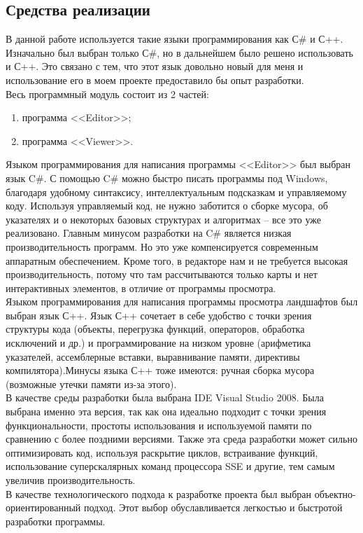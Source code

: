 \documentclass[a4paper, 10pt]{article}
\begin{document}
	\subsection{Средства реализации}
	\hspace*{5mm} В данной работе используется такие языки программирования как С\# и С++. Изначально был выбран только С\#, но в дальнейшем было решено использовать и С++. Это связано с тем, что этот язык довольно новый для меня и использование его в моем проекте предоставило бы опыт разработки.
	\\ \hspace*{5mm} Весь программный модуль состоит из 2 частей:
	\begin{enumerate}
		\item программа <<Editor>>;
		\item программа <<Viewer>>.
	\end{enumerate}
	\hspace*{5mm} Языком программирования для написания программы <<Editor>> был выбран язык C\#. С помощью C\# можно быстро писать программы под Windows, благодаря удобному синтаксису, интеллектуальным подсказкам и управляемому коду. Используя управляемый код, не нужно заботится о сборке мусора, об указателях и о некоторых базовых структурах и алгоритмах – все это уже реализовано. Главным минусом разработки на C\# является низкая производительность программ. Но это уже компенсируется современным аппаратным обеспечением. Кроме того, в редакторе нам и не требуется высокая производительность, потому что там рассчитываются только карты и нет интерактивных элементов, в отличие от программы просмотра.
	\\ \hspace*{5mm} Языком программирования для написания программы просмотра ландшафтов был выбран язык С++. Язык С++ сочетает в себе удобство с точки зрения структуры кода (объекты, перегрузка функций, операторов, обработка исключений и др.) и программирование на низком уровне (арифметика указателей, ассемблерные вставки, выравнивание памяти, директивы компилятора).Минусы языка С++ тоже имеются: ручная сборка мусора (возможные утечки памяти из-за этого).  
	\\ \hspace*{5mm} В качестве среды разработки была выбрана IDE Visual Studio 2008. Была выбрана именно эта версия, так как она идеально подходит с точки зрения функциональности, простоты использования и используемой памяти по сравнению с более поздними версиями. Также эта среда разработки может сильно оптимизировать код, используя раскрытие циклов, встраивание функций, использование суперскалярных команд процессора SSE и другие, тем самым увеличив производительность.
	\\ \hspace*{5mm} В качестве технологического подхода к разработке проекта был выбран объектно-ориентированный подход. Этот выбор обуславливается легкостью и быстротой разработки программы. 
\end{document}
